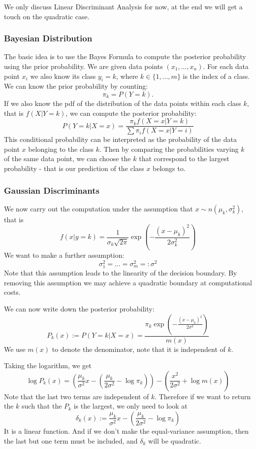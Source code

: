 \documentclass[12pt]{amsart}
\numberwithin{equation}{section}
\theoremstyle{plain}
\theoremstyle{definition}
\begin{document}
We only discuss Linear Discriminant Analysis for now, at the end we will get a touch on the quadratic case.

\subsubsection{Bayesian Distribution}
The basic idea is to use the Bayes Formula to compute the posterior probability using the prior probability. We are given data points $(x_1,\ldots, x_n)$. For each data point $x_i$ we also know its class $y_i = k$, where $k \in \{1,\ldots, m\}$ is the index of a class. We can know the prior probability by counting:
$$
\pi_k = P(Y = k).
$$
If we also know the pdf of the distribution of the data points within each class $k$, that is $f(X|Y=k)$, we can compute the posterior probability:
$$
P(Y=k|X=x) = \frac{\pi_kf(X=x|Y=k)}{\sum \pi_if(X=x|Y=i)}
$$
This conditional probability can be interpreted as the probability of the data point $x$ belonging to the class $k$. Then by comparing the probabilities varying $k$ of the same data point, we can choose the $k$ that correspond to the largest probability - that is our prediction of the class $x$ belongs to.

\subsubsection{Gaussian Discriminants}

We now carry out the computation under the assumption that $x\sim n(\mu_k,\sigma_k^2)$, that is 
$$
f(x|y=k) = \frac{1}{\sigma_k\sqrt{2\pi}}\exp(-\frac{(x-\mu_k)^2}{2\sigma_k^2})
$$
We want to make a further assumption:
$$
\sigma_1^2 = \ldots = \sigma_m^2=:\sigma^2
$$
Note that this assumption leads to the linearity of the decision boundary. By removing this assumption we may achieve a quadratic boundary at computational costs.

We can now write down the posterior probability:
\begin{equation}\label{GDA}
P_k(x) := P(Y=k|X=x) = \frac{\pi_k\exp(-\frac{(x-\mu_k)^2}{2\sigma^2})}{m(x)}
\end{equation}
We use $m(x)$ to denote the denominator, note that it is independent of $k$.

Taking the logarithm, we get
$$
\log P_k(x) = (\frac{\mu_k}{\sigma^2}x-(\frac{\mu_k}{2\sigma^2}-\log\pi_k))-(\frac{x^2}{2\sigma^2}+\log m(x))
$$
Note that the last two terms are independent of $k$. Therefore if we want to return the $k$ such that the $P_k$ is the largest, we only need to look at
$$
\delta_k(x) := \frac{\mu_k}{\sigma^2}x-(\frac{\mu_k}{2\sigma^2}-\log\pi_k)
$$
It is a linear function. And if we don't make the equal-variance assumption, then the last but one term must be included, and $\delta_k$ will be quadratic.
 
\end{document}
